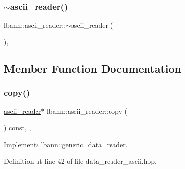 \subsubsection{\texorpdfstring{$\sim$ascii\+\_\+reader()}{~ascii\_reader()}}
{\footnotesize\ttfamily lbann\+::ascii\+\_\+reader\+::$\sim$ascii\+\_\+reader (\begin{DoxyParamCaption}{ }\end{DoxyParamCaption})\hspace{0.3cm}{\ttfamily [override]}, {\ttfamily [default]}}



\subsection{Member Function Documentation}
\mbox{\label{classlbann_1_1ascii__reader_a36b96f897e437bcd5886a052abdd9b64}} 
\subsubsection{\texorpdfstring{copy()}{copy()}}
{\footnotesize\ttfamily \hyperlink{classlbann_1_1ascii__reader}{ascii\+\_\+reader}$\ast$ lbann\+::ascii\+\_\+reader\+::copy (\begin{DoxyParamCaption}{ }\end{DoxyParamCaption}) const\hspace{0.3cm}{\ttfamily [inline]}, {\ttfamily [override]}, {\ttfamily [virtual]}}



Implements \hyperlink{classlbann_1_1generic__data__reader_a208ba1223e7aaa75e94b728501f12f86}{lbann\+::generic\+\_\+data\+\_\+reader}.



Definition at line 42 of file data\+\_\+reader\+\_\+ascii.\+hpp.


